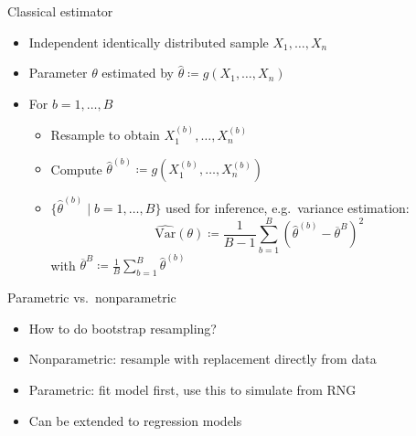 \documentclass[tikz]{beamer}
\begin{document}
\begin{frame}{Classical estimator}
  \begin{itemize}
    \item Independent identically distributed sample $X_1, \dots, X_n$
    \item Parameter $\theta$ estimated by $\widehat{\theta} \coloneqq g(X_1, \dots, X_n)$
    \item For $b = 1, \dots, B$
          \begin{itemize}
            \item Resample to obtain $X_1^{(b)}, \dots, X_n^{(b)}$
            \item Compute $\widehat{\theta}^{(b)} \coloneqq g(X_1^{(b)}, \dots, X_n^{(b)})$
            \item $\{ \widehat{\theta}^{(b)} \mid b = 1, \dots, B \}$ used for inference, e.g.\ variance estimation:
                  \begin{equation*}
                    \widehat{\mathrm{Var}}(\theta) \coloneqq \frac{1}{B - 1} \sum_{b = 1}^B (\widehat{\theta}^{(b)} - \overline{\theta}^{B})^2
                  \end{equation*}
                  with $\overline{\theta}^{B} \coloneqq \frac{1}{B} \sum_{b = 1}^B \widehat{\theta}^{(b)}$
          \end{itemize}
  \end{itemize}
\end{frame}

\begin{frame}{Parametric vs.\ nonparametric}
  \begin{itemize}
    \item How to do bootstrap resampling?
    \item Nonparametric: resample with replacement directly from data
    \item Parametric: fit model first, use this to simulate from RNG
    \item Can be extended to regression models
  \end{itemize}
\end{frame}
\end{document}
